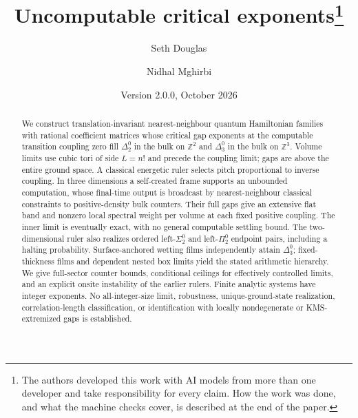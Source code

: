 \documentclass[11pt]{article}
\title{Uncomputable critical exponents\thanks{The authors developed this work with AI models from more than one developer and take responsibility for every claim. How the work was done, and what the machine checks cover, is described at the end of the paper.}}
\author{Seth Douglas \and Nidhal Mghirbi}
\date{Version 2.0.0, October 2026}
\theoremstyle{remark}
\newcommand{\Z}{\mathbb Z}
\begin{document}
\maketitle
\begin{abstract}
We construct translation-invariant nearest-neighbour quantum Hamiltonian families with rational coefficient matrices whose critical gap exponents at the computable transition coupling zero fill $\Delta^0_2$ in the bulk on $\Z^2$ and $\Delta^0_3$ in the bulk on $\Z^3$. Volume limits use cubic tori of side $L=n!$ and precede the coupling limit; gaps are above the entire ground space. A classical energetic ruler selects pitch proportional to inverse coupling. In three dimensions a self-created frame supports an unbounded computation, whose final-time output is broadcast by nearest-neighbour classical constraints to positive-density bulk counters. Their full gaps give an extensive flat band and nonzero local spectral weight per volume at each fixed positive coupling. The inner limit is eventually exact, with no general computable settling bound. The two-dimensional ruler also realizes ordered left-$\Sigma^0_2$ and left-$\Pi^0_2$ endpoint pairs, including a halting probability. Surface-anchored wetting films independently attain $\Delta^0_3$; fixed-thickness films and dependent nested box limits yield the stated arithmetic hierarchy. We give full-sector counter bounds, conditional ceilings for effectively controlled limits, and an explicit onsite instability of the earlier rulers. Finite analytic systems have integer exponents. No all-integer-size limit, robustness, unique-ground-state realization, correlation-length classification, or identification with locally nondegenerate or KMS-extremized gaps is established.
\end{abstract}














\end{document}
